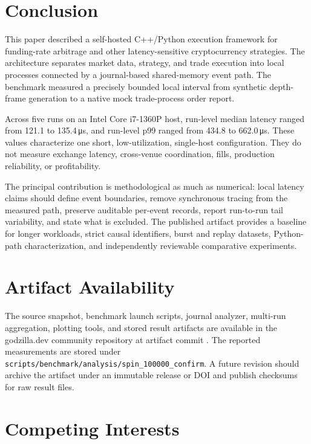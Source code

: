 \documentclass[11pt]{article}
\newcommand{\us}{\,\si{\micro\second}}
\newcommand{\framework}{godzilla.dev}
\begin{document}
\section{Conclusion}

This paper described a self-hosted C++/Python execution framework for funding-rate arbitrage and other latency-sensitive cryptocurrency strategies. The architecture separates market data, strategy, and trade execution into local processes connected by a journal-based shared-memory event path. The benchmark measured a precisely bounded local interval from synthetic depth-frame generation to a native mock trade-process order report.

Across five runs on an Intel Core i7-1360P host, run-level median latency ranged from 121.1 to 135.4\us, and run-level p99 ranged from 434.8 to 662.0\us. These values characterize one short, low-utilization, single-host configuration. They do not measure exchange latency, cross-venue coordination, fills, production reliability, or profitability.

The principal contribution is methodological as much as numerical: local latency claims should define event boundaries, remove synchronous tracing from the measured path, preserve auditable per-event records, report run-to-run tail variability, and state what is excluded. The published artifact provides a baseline for longer workloads, strict causal identifiers, burst and replay datasets, Python-path characterization, and independently reviewable comparative experiments.

\section*{Artifact Availability}

The source snapshot, benchmark launch scripts, journal analyzer, multi-run aggregation, plotting tools, and stored result artifacts are available in the \framework{} community repository at artifact commit  \cite{godzillaartifact2026}. The reported measurements are stored under \texttt{scripts/benchmark/analysis/spin\_100000\_confirm}. A future revision should archive the artifact under an immutable release or DOI and publish checksums for raw result files.

\section*{Competing Interests}
\end{document}
